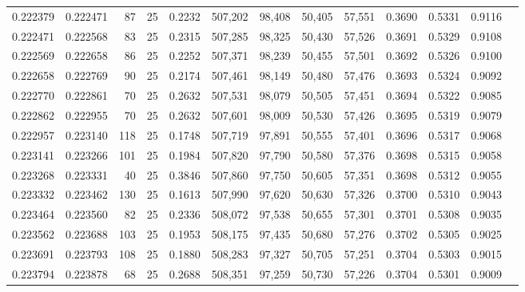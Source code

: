 \begin{tabular}{rrrrrrrrrrrrr}
0.222379 & 0.222471 &    87 &  25 &                                     0.2232 & 507,202 &  98,408 &  50,405 &  57,551 & 0.3690 & 0.5331 & 0.9116 \\
0.222471 & 0.222568 &    83 &  25 &                                     0.2315 & 507,285 &  98,325 &  50,430 &  57,526 & 0.3691 & 0.5329 & 0.9108 \\
0.222569 & 0.222658 &    86 &  25 &                                     0.2252 & 507,371 &  98,239 &  50,455 &  57,501 & 0.3692 & 0.5326 & 0.9100 \\
0.222658 & 0.222769 &    90 &  25 &                                     0.2174 & 507,461 &  98,149 &  50,480 &  57,476 & 0.3693 & 0.5324 & 0.9092 \\
0.222770 & 0.222861 &    70 &  25 &                                     0.2632 & 507,531 &  98,079 &  50,505 &  57,451 & 0.3694 & 0.5322 & 0.9085 \\
0.222862 & 0.222955 &    70 &  25 &                                     0.2632 & 507,601 &  98,009 &  50,530 &  57,426 & 0.3695 & 0.5319 & 0.9079 \\
0.222957 & 0.223140 &   118 &  25 &                                     0.1748 & 507,719 &  97,891 &  50,555 &  57,401 & 0.3696 & 0.5317 & 0.9068 \\
0.223141 & 0.223266 &   101 &  25 &                                     0.1984 & 507,820 &  97,790 &  50,580 &  57,376 & 0.3698 & 0.5315 & 0.9058 \\
0.223268 & 0.223331 &    40 &  25 &                                     0.3846 & 507,860 &  97,750 &  50,605 &  57,351 & 0.3698 & 0.5312 & 0.9055 \\
0.223332 & 0.223462 &   130 &  25 &                                     0.1613 & 507,990 &  97,620 &  50,630 &  57,326 & 0.3700 & 0.5310 & 0.9043 \\
0.223464 & 0.223560 &    82 &  25 &                                     0.2336 & 508,072 &  97,538 &  50,655 &  57,301 & 0.3701 & 0.5308 & 0.9035 \\
0.223562 & 0.223688 &   103 &  25 &                                     0.1953 & 508,175 &  97,435 &  50,680 &  57,276 & 0.3702 & 0.5305 & 0.9025 \\
0.223691 & 0.223793 &   108 &  25 &                                     0.1880 & 508,283 &  97,327 &  50,705 &  57,251 & 0.3704 & 0.5303 & 0.9015 \\
0.223794 & 0.223878 &    68 &  25 &                                     0.2688 & 508,351 &  97,259 &  50,730 &  57,226 & 0.3704 & 0.5301 & 0.9009 \\

\end{tabular}
